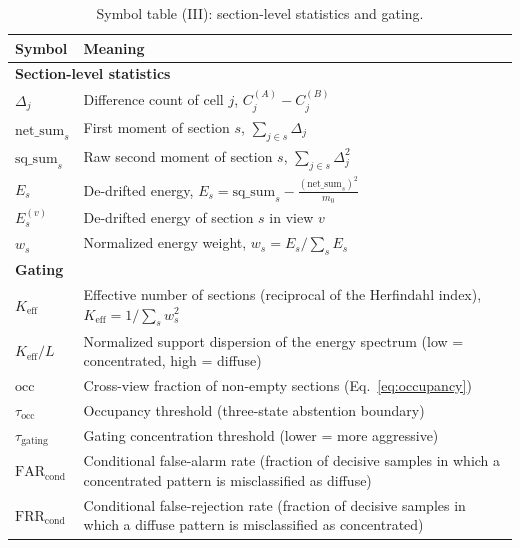 \begin{table}[!thbp]
\centering
\small
\begin{tabular}{lp{}}
\toprule
Symbol & Meaning \\
\midrule
\multicolumn{2}{l}{\textbf{Section-level statistics}} \\
$\Delta_j$ & Difference count of cell $j$, $C^{(A)}_j-C^{(B)}_j$ \\
$\mathrm{net\_sum}_s$ & First moment of section $s$, $\sum_{j\in s}\Delta_j$ \\
$\mathrm{sq\_sum}_s$ & Raw second moment of section $s$, $\sum_{j\in s}\Delta_j^2$ \\
$E_s$ & De-drifted energy, $E_s=\mathrm{sq\_sum}_s-\frac{(\mathrm{net\_sum}_s)^2}{m_0}$ \\
$E_s^{(v)}$ & De-drifted energy of section $s$ in view $v$ \\
$w_s$ & Normalized energy weight, $w_s=E_s/\sum_s E_s$ \\
\midrule
\multicolumn{2}{l}{\textbf{Gating}} \\
$K_{\text{eff}}$ & Effective number of sections (reciprocal of the Herfindahl index), $K_{\text{eff}}=1/\sum_s w_s^2$ \\
$K_{\text{eff}}/L$ & Normalized support dispersion of the energy spectrum (low = concentrated, high = diffuse) \\
$\mathrm{occ}$ & Cross-view fraction of non-empty sections (Eq.~\eqref{eq:occupancy}) \\
$\tau_{\text{occ}}$ & Occupancy threshold (three-state abstention boundary) \\
$\tau_{\text{gating}}$ & Gating concentration threshold (lower = more aggressive) \\
$\mathrm{FAR_{cond}}$ & Conditional false-alarm rate (fraction of decisive samples in which a concentrated pattern is misclassified as diffuse) \\
$\mathrm{FRR_{cond}}$ & Conditional false-rejection rate (fraction of decisive samples in which a diffuse pattern is misclassified as concentrated) \\
\bottomrule
\end{tabular}
\caption{Symbol table (III): section-level statistics and gating.}
\label{tab:notations-2}
\end{table}
